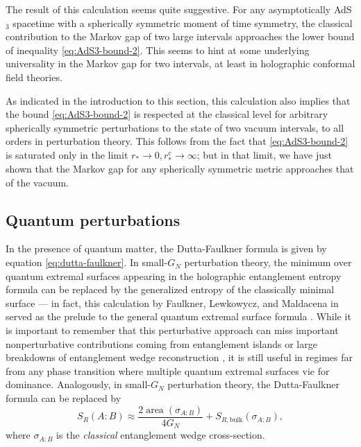 \documentclass[a4paper,11pt]{article}
\newcommand{\area}{\operatorname{area}}
\begin{document}
The result of this calculation seems quite suggestive. For any asymptotically AdS$_3$ spacetime with a spherically symmetric moment of time symmetry, the classical contribution to the Markov gap of two large intervals approaches the lower bound of inequality \eqref{eq:AdS3-bound-2}. This seems to hint at some underlying universality in the Markov gap for two intervals, at least in holographic conformal field theories.

As indicated in the introduction to this section, this calculation also implies that the bound \eqref{eq:AdS3-bound-2} is respected at the classical level for arbitrary spherically symmetric perturbations to the state of two vacuum intervals, to all orders in perturbation theory. This follows from the fact that \eqref{eq:AdS3-bound-2} is saturated only in the limit $r_* \rightarrow 0, r_*^c \rightarrow \infty$; but in that limit, we have just shown that the Markov gap for any spherically symmetric metric approaches that of the vacuum.

\subsection{Quantum perturbations}
\label{subsec:quantum-matter}

In the presence of quantum matter, the Dutta-Faulkner formula is given by equation \eqref{eq:dutta-faulkner}. In small-$G_N$ perturbation theory, the minimum over quantum extremal surfaces appearing in the holographic entanglement entropy formula can be replaced by the generalized entropy of the classically minimal surface --- in fact, this calculation by Faulkner, Lewkowycz, and Maldacena in \cite{FLM} served as the prelude to the general quantum extremal surface formula \cite{QES}. While it is important to remember that this perturbative approach can miss important nonperturbative contributions coming from entanglement islands \cite{islands1, islands2} or large breakdowns of entanglement wedge reconstruction \cite{akers2019large}, it is still useful in regimes far from any phase transition where multiple quantum extremal surfaces vie for dominance. Analogously, in small-$G_N$ perturbation theory, the Dutta-Faulkner formula can be replaced by
\begin{equation}
    S_R(A:B) \approx \frac{2 \area(\sigma_{A:B})}{4 G_N} + S_{R, \text{bulk}}(\sigma_{A:B}),
\end{equation}
where $\sigma_{A:B}$ is the \emph{classical} entanglement wedge cross-section.
\end{document}
